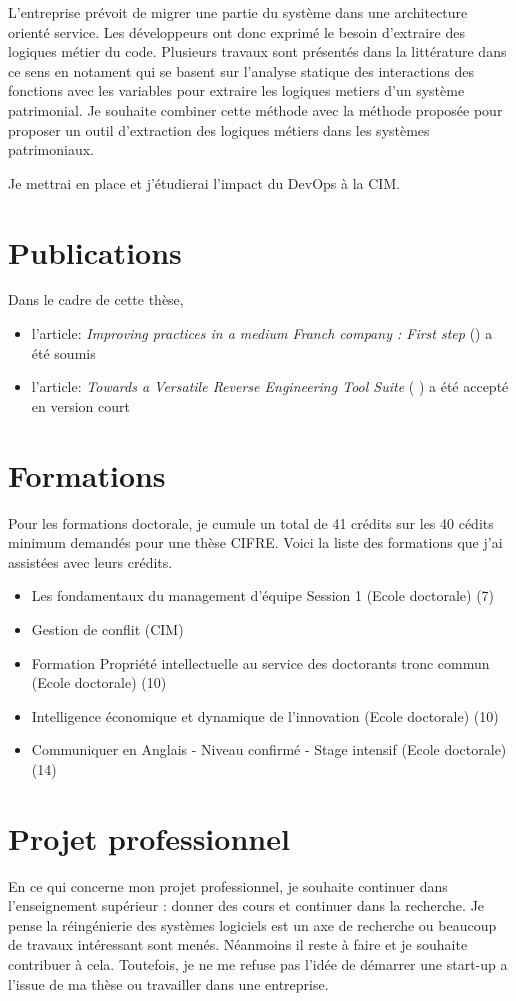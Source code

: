 \documentclass[a4paper]{article}
\begin{document}
L'entreprise prévoit de migrer une partie du système dans une architecture orienté service. 
Les développeurs ont donc exprimé le besoin d'extraire des logiques métier du code.
Plusieurs travaux sont présentés dans la littérature dans ce sens en notament \cite{Lei05a,Cose12a,Norm12a} qui se basent sur l'analyse statique des interactions des fonctions avec les variables pour extraire les logiques metiers d'un système patrimonial. 
Je souhaite combiner cette méthode avec la méthode proposée \cite{anqu19a} pour proposer un outil d'extraction des logiques métiers dans les systèmes patrimoniaux.

Je mettrai en place et j'étudierai l'impact du DevOps à la CIM. 

\section{Publications}
Dans le cadre de cette thèse,
\begin{itemize}
  \item l'article: \textit{Improving practices in a medium Franch company : First step} (\citet{Houe20a}) a été soumis
\item l'article: \textit{Towards a Versatile Reverse Engineering Tool Suite}  ( \citet{Houe20b}) a été accepté en version court
\end{itemize}



\section{Formations}
Pour les formations doctorale, je cumule un  total de 41 crédits sur les 40 cédits minimum demandés pour une thèse CIFRE. 
Voici la liste des formations que j'ai assistées  avec leurs crédits.
\begin{itemize}
\item Les fondamentaux du management d’équipe Session 1 (Ecole doctorale)  (7)
\item Gestion de conflit (CIM) 
\item Formation Propriété intellectuelle au service des doctorants tronc commun (Ecole doctorale) (10)
\item Intelligence économique et dynamique de l'innovation (Ecole doctorale) (10)
\item Communiquer en Anglais - Niveau confirmé - Stage intensif (Ecole doctorale) (14)
\end{itemize}

\section{Projet professionnel}
En ce qui concerne mon projet professionnel, je souhaite continuer dans l'enseignement supérieur : donner des cours et continuer dans la recherche.
Je pense la réingénierie des systèmes logiciels est un axe de recherche ou beaucoup de travaux intéressant sont menés. Néanmoins il reste à faire et je souhaite contribuer à cela.
Toutefois, je ne me refuse pas l'idée de démarrer une start-up a l'issue de ma thèse ou travailler dans une entreprise.

\footnotesize{
 

}
\end{document}
